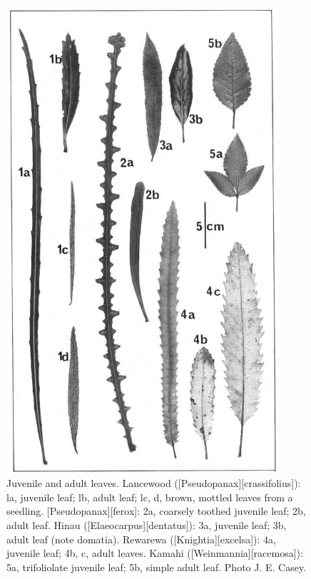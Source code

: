 \begin{figure}[!htb]
\begin{minipage}[t]{0.464\textwidth}
    	\includegraphics[width=0.9\textwidth]{graphics/figure19leaves.jpg}
    	\caption[Juvenile and adult leaves]{Juvenile and adult leaves.
        Lancewood ([Pseudopanax][crassifolius]): la, juvenile leaf; lb, adult leaf; lc, d, brown, mottled leaves from a seedling. [Pseudopanax][ferox]: 2a, coarsely toothed juvenile leaf; 2b, adult leaf.
        Hinau ([Elaeocarpus][dentatus]): 3a, juvenile leaf; 3b, adult leaf (note domatia).
        Rewarewa ([Knightia][excelsa]): 4a, juvenile leaf; 4b, c, adult leaves.
        Kamahi ([Weinmannia][racemosa]): 5a, trifoliolate juvenile leaf; 5b, simple adult leaf.
        Photo  J. E. Casey.}%
    	\label{fig:19leaves}
	\end{minipage}
\end{figure}

